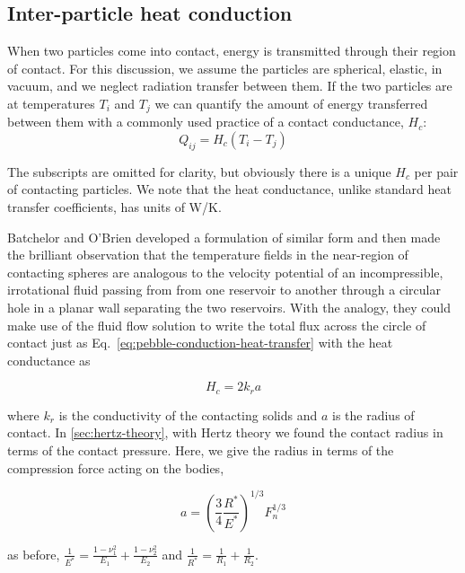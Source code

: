 \subsection{Inter-particle heat conduction}\label{sec:ht-pebble-conduction}

When two particles come into contact, energy is transmitted through their region of contact. For this discussion, we assume the particles are spherical, elastic, in vacuum, and we neglect radiation transfer between them. If the two particles are at temperatures $T_i$ and $T_j$ we can quantify the amount of energy transferred between them with a commonly used practice of a contact conductance, $H_c$:
\begin{equation}\label{eq:pebble-conduction-heat-transfer}
	Q_{ij} = H_{c}(T_i - T_j)
\end{equation}

The subscripts are omitted for clarity, but obviously there is a unique $H_c$ per pair of contacting particles. We note that the heat conductance, unlike standard heat transfer coefficients, has units of \si{W/K}.

Batchelor and O'Brien\cite{Batchelor1977} developed a formulation of similar form and then made the brilliant observation that the temperature fields in the near-region of contacting spheres are analogous to the velocity potential of an incompressible, irrotational fluid passing from from one reservoir to another through a circular hole in a planar wall separating the two reservoirs. With the analogy, they could make use of the fluid flow solution to write the total flux across the circle of contact just as Eq.~\ref{eq:pebble-conduction-heat-transfer} with the heat conductance as

\begin{equation}\label{eq:batchelor-pebble-conductance}
	H_c = 2k_ra
\end{equation}

where $k_r$ is the conductivity of the contacting solids and $a$ is the radius of contact. In \cref{sec:hertz-theory}, with Hertz theory we found the contact radius in terms of the contact pressure. Here, we give the radius in terms of the compression force acting on the bodies,

\begin{equation}
	a =  \left(\frac{3}{4}\frac{R^*}{E^*}\right)^{1/3}F_n^{1/3}	
\end{equation}

as before, $\frac{1}{E^*} = \frac{1-\nu_1^2}{E_1} + \frac{1-\nu_2^2}{E_2}$ and $\frac{1}{R^*} = \frac{1}{R_1} + \frac{1}{R_2}$. 

